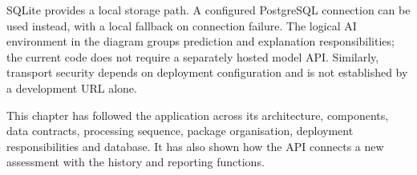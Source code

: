 SQLite provides a local storage path. A configured PostgreSQL connection can be used instead, with a local fallback on connection failure. The logical AI environment in the diagram groups prediction and explanation responsibilities; the current code does not require a separately hosted model API. Similarly, transport security depends on deployment configuration and is not established by a development URL alone.


\par\medskip\noindent
This chapter has followed the application across its architecture, components, data contracts, processing sequence, package organisation, deployment responsibilities and database. It has also shown how the API connects a new assessment with the history and reporting functions.
